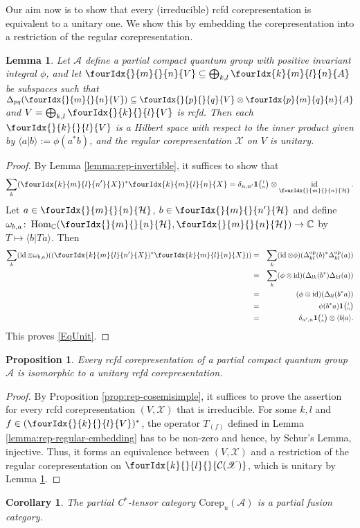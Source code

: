 \documentclass[10pt]{article}
\DeclareMathOperator{\id}{id}
\DeclareMathOperator{\Hom}{Hom}
\DeclareMathOperator{\op}{\mathrm{op}}
\newcommand{\dual}[1]{#1^{*}}
\newcommand{\Corep}{\mathrm{Corep}}
\newcommand{\C}{\mathbb{C}}
\newcommand{\Hsp}{\mathcal{H}}
\newcommand{\Grt}[3]{#1{\tiny {\begin{pmatrix} #2\\#3\end{pmatrix}}}}
\newcommand{\UnitC}[2]{\Grt{\mathbf{1}}{#1}{#2}}
\newcommand{\Gr}[5]{\fourIdx{#2}{#4}{#3}{#5}{#1}}%
\newcommand{\Gru}[3]{\Gr{#1}{}{}{#2}{#3}}
\newcommand{\Grd}[3]{\Gr{#1}{#2}{#3}{}{}}
\newtheorem{Lem}[Theorem]{Lemma}
\newtheorem{Prop}[Theorem]{Proposition}
\newtheorem{Cor}[Theorem]{Corollary}
\theoremstyle{definition}
\numberwithin{equation}{section}
\begin{document}
Our aim now is to show that every (irreducible) rcfd corepresentation is
equivalent to a unitary one. We show this by embedding the
corepresentation into a restriction of the regular corepresentation.
\begin{Lem} \label{lemma:rep-regular-unitary}
  Let $\mathscr{A}$ define a partial compact quantum group with
positive invariant  integral $\phi$, and let $\Gru{V}{m}{n} \subseteq
\bigoplus_{k,l} \Gr{A}{k}{l}{m}{n}$ be subspaces such that
$\Delta_{pq}(\Gru{V}{m}{n}) \subseteq \Gru{V}{p}{q} \otimes
    \Gr{A}{p}{q}{m}{n}$ and $V=\bigoplus_{k,l} \Gru{V}{k}{l}$ is rcfd. Then each $\Gru{V}{k}{l}$ is a Hilbert space with
    respect to the inner product given by $\langle
    a|b\rangle:=\phi(a^{*}b)$, and the regular corepresentation
    $\mathscr{X}$ on $V$ is unitary.
\end{Lem}
\begin{proof} 
By Lemma \ref{lemma:rep-invertible},  it suffices to show that
  \begin{equation}\label{EqUnit} \sum_{k}
    (\Gr{X}{k}{l}{m}{n'})^* \Gr{X}{k}{l}{m}{n} =
    \delta_{n,n'}\UnitC{l}{n}\otimes
    \id_{\Gru{\Hsp}{m}{n}}.
  \end{equation} 
Let  $a\in \Gru{\Hsp}{m}{n}$, $b\in \Gru{\Hsp}{m}{n'}$ and define $\omega_{b,a} \colon
\Hom_{\C}(\Gru{\Hsp}{m}{n},\Gru{\Hsp}{m}{n}) \to \C$ by $T
\mapsto \langle b|Ta\rangle$. Then
\begin{eqnarray*}
\sum_{k }(\id \otimes \omega_{b,a})
((\Gr{X}{k}{l}{m}{n'})^* \Gr{X}{k}{l}{m}{n}))  &=& \sum_k
(\id\otimes \phi)(\Delta_{kl}^{\op}(b)^*\Delta_{kl}^{\op}(a))\\
  &=& \sum_k (\phi\otimes
  \id)(\Delta_{lk}(b^*)\Delta_{kl}(a)) \\ &=& (\phi\otimes
  \id)(\Delta_{ll}(b^*a)) \\ &=& \phi(b^*a)\UnitC{l}{n} \\&=&
  \delta_{n',n} \UnitC{l}{n} \otimes \langle b|a\rangle.
\end{eqnarray*} 
This proves \eqref{EqUnit}.
\end{proof} 

\begin{Prop} \label{prop:rep-unitarisable} Every  rcfd
  corepresentation of a partial compact quantum group $\mathscr{A}$ is
  isomorphic to a unitary rcfd corepresentation.
\end{Prop}
\begin{proof}
  By Proposition \ref{prop:rep-cosemisimple}, it suffices to prove the
  assertion for every rcfd corepresentation $(V,\mathscr{X})$ that is
  irreducible.  For some $k,l$ and $f \in
  \dual{(\Gru{V}{k}{l})}$, the operator $T_{(f)}$ defined in
  Lemma \ref{lemma:rep-regular-embedding} has to be non-zero and
  hence, by Schur's Lemma, injective. Thus, it forms an equivalence
  between $(V,\mathscr{X})$ and a restriction of the regular
  corepresentation on $\Grd{\mathcal{C}(\mathscr{X})}{k}{l}$, which is
  unitary by Lemma \ref{lemma:rep-regular-unitary}.
\end{proof}
\begin{Cor} The partial C$^*$-tensor category $\Corep_u(\mathscr{A})$ is a partial fusion category.
\end{Cor}
\end{document}
